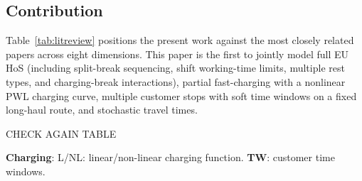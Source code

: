 \documentclass[preprint,12pt,3p]{elsarticle}
\begin{document}
\subsection{Contribution}

Table~\ref{tab:litreview} positions the present work against the most closely related papers across eight dimensions. This paper is the first to jointly model full EU HoS (including split-break sequencing, shift working-time limits, multiple rest types, and charging-break interactions), partial fast-charging with a nonlinear PWL charging curve, multiple customer stops with soft time windows on a fixed long-haul route, and stochastic travel times.

{\color{red} CHECK AGAIN TABLE}

\begin{table}[htbp]
\centering
\caption{Positioning of the present work in the literature.}
\label{tab:litreview}
\scriptsize
\setlength{\tabcolsep}{3.5pt}
\par\smallskip
\begin{minipage}{\textwidth}
\footnotesize
\textbf{Charging}: L/NL: linear/non-linear charging function.
\textbf{TW}: customer time windows.
\end{minipage}
\end{table}
\end{document}
